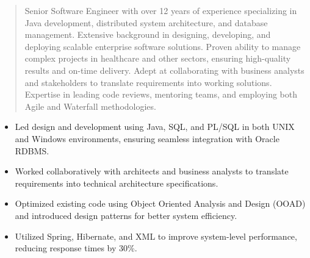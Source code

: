 



\makecvheader

\begin{quote}
  \noindent
  Senior Software Engineer with over 12 years of experience specializing in Java development, distributed system architecture, and database management. Extensive background in designing, developing, and deploying scalable enterprise software solutions. Proven ability to manage complex projects in healthcare and other sectors, ensuring high-quality results and on-time delivery. Adept at collaborating with business analysts and stakeholders to translate requirements into working solutions. Expertise in leading code reviews, mentoring teams, and employing both Agile and Waterfall methodologies.
\end{quote}

\par\smallskip
\noindent
\begin{minipage}{20cm}
  \begin{minipage}{9.75cm}
    \begin{itemize}
      \item Led design and development using Java, SQL, and PL/SQL in both UNIX and Windows environments, ensuring seamless integration with Oracle RDBMS.
      \item Worked collaboratively with architects and business analysts to translate requirements into technical architecture specifications.
    \end{itemize}
  \end{minipage}
  \hfill
  \begin{minipage}{9.75cm}
    \begin{itemize}
      \item Optimized existing code using Object Oriented Analysis and Design (OOAD) and introduced design patterns for better system efficiency.
      \item Utilized Spring, Hibernate, and XML to improve system-level performance, reducing response times by 30\%.
    \end{itemize}
  \end{minipage}
\end{minipage}
\par\smallskip
\divider

